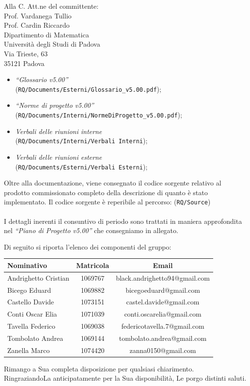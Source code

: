 \documentclass[a4paper,12pt]{letteracdp}
\begin{document}
\begin{letter}{
		Alla C. Att.ne del committente: \\
		Prof. Vardanega Tullio \\
		Prof. Cardin Riccardo \\
		Dipartimento di Matematica \\
		Università degli Studi di Padova \\
		Via Trieste, 63 \\
		35121 Padova}
\begin{itemize}
	\item \textit{“Glossario v5.00”} \\(\texttt{RQ/Documents/Esterni/Glossario\_v5.00.pdf});
	
	\item \textit{“Norme di progetto v5.00”} \\(\texttt{RQ/Documents/Interni/NormeDiProgetto\_v5.00.pdf});

	\item \textit{Verbali delle riunioni interne}	\\(\texttt{RQ/Documents/Interni/Verbali Interni});
	
	\item \textit{Verbali delle riunioni esterne}	\\(\texttt{RQ/Documents/Esterni/Verbali Esterni});
		
\end{itemize}

Oltre alla documentazione, viene consegnato il codice sorgente relativo al prodotto commissionato completo della descrizione di quanto è stato implementato. Il codice sorgente è reperibile al percorso: (\texttt{RQ/Source})
\\\\I dettagli inerenti il consuntivo di periodo sono trattati in maniera approfondita nel \textit{``Piano di Progetto v5.00''} che consegniamo in allegato.

Di seguito si riporta l'elenco dei componenti del gruppo:

\begin{center}
		\begin{tabular}{l c c}
			\toprule
			\textbf{Nominativo} & \textbf{Matricola} & \textbf{Email} \\
			\midrule
			Andrighetto Cristian & 1069767 & black.andrighetto94@gmail.com \\
			Bicego Eduard & 1069882 & bicegoeduard@gmail.com  \\
			Castello Davide	& 1073151 &	 castel.davide@gmail.com\\
			Conti Oscar Elia & 1071039 & conti.oscarelia@gmail.com \\
			Tavella Federico & 1069038 & federicotavella.7@gmail.com\\
			Tombolato Andrea & 1069144 & tombolato.andrea@gmail.com	 \\
			Zanella Marco & 1074420 & zanna0150@gmail.com \\
			\bottomrule
		\end{tabular}
\end{center}
		
		\closing{Rimango a Sua completa disposizione per qualsiasi chiarimento. \\
		RingraziandoLa anticipatamente per la Sua disponibilità, Le porgo distinti saluti.}
		
	\end{letter}
\end{document}
